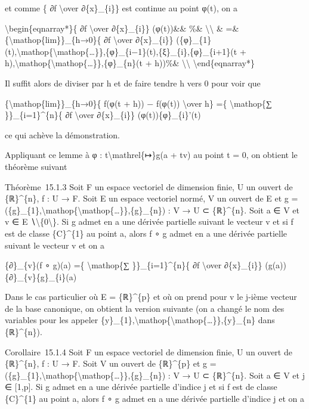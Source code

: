 \documentclass[]{article}
\begin{document}
et comme \{ ∂f \textbackslash{}over ∂\{x\}\_\{i\}\} est continue au
point φ(t), on a

\textbackslash{}begin\{eqnarray*\}\{ ∂f \textbackslash{}over
∂\{x\}\_\{i\}\} (φ(t))\&\& \%\& \textbackslash{}\textbackslash{} \& =\&
\{\textbackslash{}mathop\{lim\}\}\_\{h→0\}\{ ∂f \textbackslash{}over
∂\{x\}\_\{i\}\}
(\{φ\}\_\{1\}(t),\textbackslash{}mathop\{\textbackslash{}mathop\{\ldots{}\}\},\{φ\}\_\{i−1\}(t),\{ξ\}\_\{i\},\{φ\}\_\{i+1\}(t
+
h),\textbackslash{}mathop\{\textbackslash{}mathop\{\ldots{}\}\},\{φ\}\_\{n\}(t
+ h))\%\& \textbackslash{}\textbackslash{}
\textbackslash{}end\{eqnarray*\}

Il suffit alors de diviser par h et de faire tendre h vers 0 pour voir
que

\{\textbackslash{}mathop\{lim\}\}\_\{h→0\}\{ f(φ(t + h)) − f(φ(t))
\textbackslash{}over h\} =\{ \textbackslash{}mathop\{∑
\}\}\_\{i=1\}\^{}\{n\}\{ ∂f \textbackslash{}over ∂\{x\}\_\{i\}\}
(φ(t))\{φ\}\_\{i\}'(t)

ce qui achève la démonstration.

Appliquant ce lemme à φ : t\textbackslash{}mathrel\{↦\}g(a + tv) au
point t = 0, on obtient le théorème suivant

Théorème~15.1.3 Soit F un espace vectoriel de dimension finie, U un
ouvert de \{ℝ\}\^{}\{n\}, f : U → F. Soit E un espace vectoriel normé, V
un ouvert de E et g =
(\{g\}\_\{1\},\textbackslash{}mathop\{\textbackslash{}mathop\{\ldots{}\}\},\{g\}\_\{n\})
: V → U ⊂ \{ℝ\}\^{}\{n\}. Soit a ∈ V et v ∈ E
∖\textbackslash{}\{0\textbackslash{}\}. Si g admet en a une dérivée
partielle suivant le vecteur v et si f est de classe \{C\}\^{}\{1\} au
point a, alors f ∘ g admet en a une dérivée partielle suivant le vecteur
v et on a

\{∂\}\_\{v\}(f ∘ g)(a) =\{ \textbackslash{}mathop\{∑
\}\}\_\{i=1\}\^{}\{n\}\{ ∂f \textbackslash{}over ∂\{x\}\_\{i\}\}
(g(a))\{∂\}\_\{v\}\{g\}\_\{i\}(a)

Dans le cas particulier où E = \{ℝ\}\^{}\{p\} et où on prend pour v le
j-ième vecteur de la base canonique, on obtient la version suivante (on
a changé le nom des variables pour les appeler
\{y\}\_\{1\},\textbackslash{}mathop\{\textbackslash{}mathop\{\ldots{}\}\},\{y\}\_\{n\}
dans \{ℝ\}\^{}\{n\}).

Corollaire~15.1.4 Soit F un espace vectoriel de dimension finie, U un
ouvert de \{ℝ\}\^{}\{n\}, f : U → F. Soit V un ouvert de \{ℝ\}\^{}\{p\}
et g =
(\{g\}\_\{1\},\textbackslash{}mathop\{\textbackslash{}mathop\{\ldots{}\}\},\{g\}\_\{n\})
: V → U ⊂ \{ℝ\}\^{}\{n\}. Soit a ∈ V et j ∈ {[}1,p{]}. Si g admet en a
une dérivée partielle d'indice j et si f est de classe \{C\}\^{}\{1\} au
point a, alors f ∘ g admet en a une dérivée partielle d'indice j et on a
\end{document}
